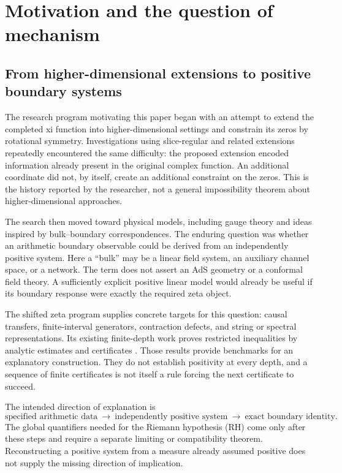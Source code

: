 \documentclass[11pt]{article}
\numberwithin{equation}{section}
\theoremstyle{definition}
\theoremstyle{remark}
\begin{document}
\clearpage
\tableofcontents
\clearpage

\section{Motivation and the question of mechanism}
\label{sec:motivation}

\subsection{From higher-dimensional extensions to positive boundary systems}

The research program motivating this paper began with an attempt to extend
the completed xi function into higher-dimensional settings and constrain its
zeros by rotational symmetry. Investigations using slice-regular and related
extensions repeatedly encountered the same difficulty: the proposed
extension encoded information already present in the original complex
function. An additional coordinate did not, by itself, create an additional
constraint on the zeros. This is the history reported by the researcher,
not a general impossibility theorem about higher-dimensional approaches.

The search then moved toward physical models, including gauge theory and
ideas inspired by bulk--boundary correspondences. The enduring question was
whether an arithmetic boundary observable could be derived from an
independently positive system. Here a ``bulk'' may be a linear field system,
an auxiliary channel space, or a network. The term does not assert an AdS
geometry or a conformal field theory. A sufficiently explicit positive
linear model would already be useful if its boundary response were exactly
the required zeta object.

The shifted zeta program supplies concrete targets for this question:
causal transfers, finite-interval generators, contraction defects, and
string or spectral representations. Its existing finite-depth work proves
restricted inequalities by analytic estimates and certificates
\cite{BakerFirst,BakerWeil}. Those results provide benchmarks for an
explanatory construction. They do not establish positivity at every depth,
and a sequence of finite certificates is not itself a rule forcing the
next certificate to succeed.

The intended direction of explanation is
\[
\text{specified arithmetic data}
\ \longrightarrow\ \text{independently positive system}
\ \longrightarrow\ \text{exact boundary identity}.
\]
The global quantifiers needed for the Riemann hypothesis (RH) come only
after these steps and require a separate limiting or compatibility theorem.
Reconstructing a positive system from a measure already assumed positive
does not supply the missing direction of implication.
\end{document}
